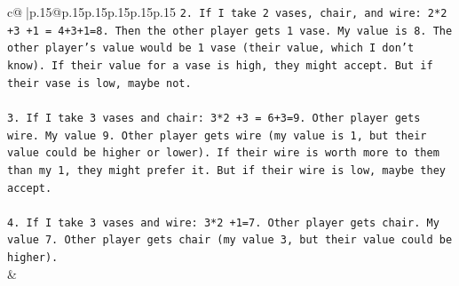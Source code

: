 \documentclass{article}
\begin{document}
{\begin{supertabular}{c@{$\;$}|p{.15\linewidth}@{}p{.15\linewidth}p{.15\linewidth}p{.15\linewidth}p{.15\linewidth}p{.15\linewidth}}
{{{\texttt{2. If I take 2 vases, chair, and wire: 2*2 +3 +1 = 4+3+1=8. Then the other player gets 1 vase. My value is 8. The other player's value would be 1 vase (their value, which I don't know). If their value for a vase is high, they might accept. But if their vase is low, maybe not.} \\
\\ 
\texttt{3. If I take 3 vases and chair: 3*2 +3 = 6+3=9. Other player gets wire. My value 9. Other player gets wire (my value is 1, but their value could be higher or lower). If their wire is worth more to them than my 1, they might prefer it. But if their wire is low, maybe they accept.} \\
\\ 
\texttt{4. If I take 3 vases and wire: 3*2 +1=7. Other player gets chair. My value 7. Other player gets chair (my value 3, but their value could be higher).} \\
            }
        }
    }
    & \\ \\


\end{supertabular}}
\end{document}
